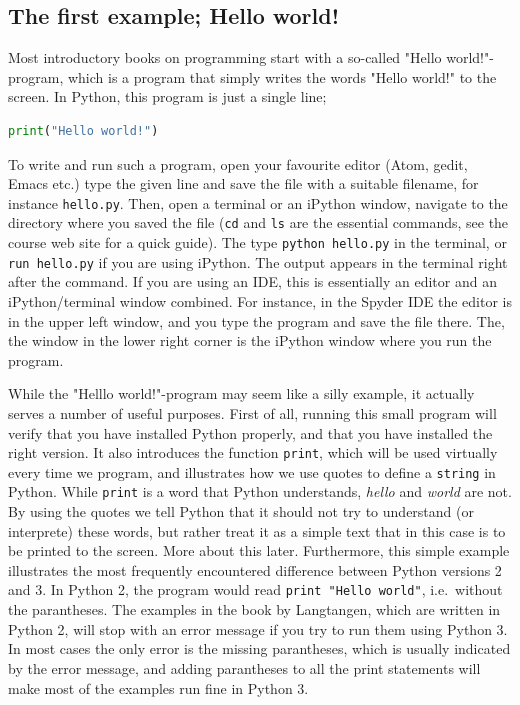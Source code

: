 \documentclass[graybox,envcountchap,sectrefs,final]{svmonodo}
\begin{document}
\subsection{The first example; Hello world!}
Most introductory books on programming start with a so-called "Hello world!"-program, which is a program
that simply writes the words "Hello world!" to the screen. In Python, this program is just a single line;
\begin{lstlisting}[language=Python,style=blue1bar]
print("Hello world!")
\end{lstlisting}
To write and run such a program, open your favourite editor (Atom, gedit, Emacs etc.) type
the given line and save the file with a suitable filename, for instance \texttt{hello.py}. Then, open a terminal or an iPython window,
navigate to the directory where you saved the file (\texttt{cd} and \texttt{ls} are the essential commands, see the course web site for a
quick guide). The type \texttt{python hello.py} in the terminal, or \texttt{run hello.py} if you are using iPython. The output appears
in the terminal right after the command. If you are using an IDE, this is essentially an editor and an iPython/terminal window
combined. For instance, in the Spyder IDE the editor is in the upper left window, and you type the program and save the file there.
The, the window in the lower right corner is the iPython window where you run the program.

While the "Helllo world!"-program may seem like a silly example, it actually serves a number of useful purposes. First of all,
running this small program will verify that you have installed Python properly, and that you have installed the right version.
It also introduces the function \texttt{print}, which will be used virtually every time we program, and
illustrates how we use quotes to define a \texttt{string} in Python. While \texttt{print} is a word that Python understands, \emph{hello} and
\emph{world} are not. By using the quotes we tell Python that it should not try to understand (or interprete) these words, but
rather treat it as a simple text that in this case is to be printed to the screen. More about this later. Furthermore, this simple example
illustrates the most frequently encountered difference between Python versions 2 and 3. In Python 2, the program would read
\texttt{print "Hello world"}, i.e.~without the parantheses. The examples in the book by Langtangen, which are written
in Python 2, will stop with an error message if you try to run them using Python 3. In most cases the only error is the
missing parantheses, which is usually indicated by the error message, and adding parantheses to all the print statements
will make most of the examples run fine in Python 3.
\end{document}
